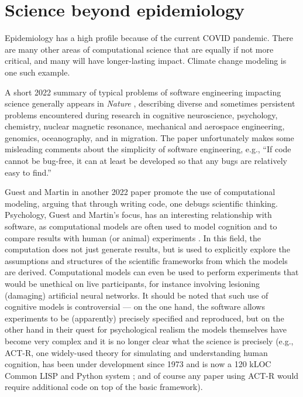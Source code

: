 \section{Science beyond epidemiology}
\label{section-science-beyond-epidemiology}
\begin{change}
Epidemiology has a high profile because of the current COVID pandemic. There are many other areas of computational science that are equally if not more critical, and many will have longer-lasting impact. Climate change modeling is one such example.

A short 2022 summary of typical problems of software engineering impacting science generally appears in \emph{Nature} \cite{nature-review}, describing diverse and sometimes persistent problems encountered during research in cognitive neuroscience, psychology, chemistry, nuclear magnetic resonance, mechanical and aerospace engineering, genomics, oceanography, and in migration. The paper \cite{nature-review} unfortunately makes some misleading comments about the simplicity of software engineering, e.g., ``If code cannot be bug-free, it can at least be developed so that any bugs are relatively easy to find.''

Guest and Martin \cite{psychological-modeling} in another 2022 paper promote the use of computational modeling, arguing that through writing code, one debugs scientific thinking. Psychology, Guest and Martin's focus, has an interesting relationship with software, as computational models are often used to model cognition and to compare results with human (or animal) experiments \cite{psychological-modeling}. In this field, the computation does not just generate results, but is used to explicitly explore the assumptions and structures of the scientific frameworks from which the models are derived. Computational models can even be used to perform experiments that would be unethical on live participants, for instance involving lesioning (damaging) artificial neural networks. It should be noted that such use of cognitive models is controversial --- on the one hand, the software allows experiments to be (apparently) precisely specified and reproduced, but on the other hand in their quest for psychological realism the models themselves have become very complex and it is no longer clear what the science is precisely (e.g., ACT-R, one widely-used theory for simulating and understanding human cognition, has been under development since 1973 and is now a 120 kLOC Common LISP and Python system \cite{actr}; and of course any paper using ACT-R would require additional code on top of the basic framework).


\end{change}
